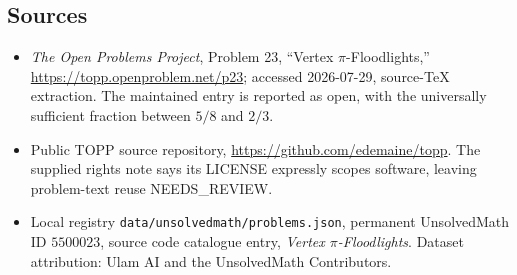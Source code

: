 \documentclass[11pt]{article}
\begin{document}
\subsection{Sources}
\begin{itemize}
\item \emph{The Open Problems Project}, Problem 23, ``Vertex $\pi$-Floodlights,'' \url{https://topp.openproblem.net/p23}; accessed 2026-07-29, source-TeX extraction. The maintained entry is reported as open, with the universally sufficient fraction between $5/8$ and $2/3$.
\item Public TOPP source repository, \url{https://github.com/edemaine/topp}. The supplied rights note says its LICENSE expressly scopes software, leaving problem-text reuse NEEDS\_REVIEW.
\item Local registry \texttt{data/unsolvedmath/problems.json}, permanent UnsolvedMath ID $5500023$, source code catalogue entry, \emph{Vertex $\pi$-Floodlights}. Dataset attribution: Ulam AI and the UnsolvedMath Contributors.
\end{itemize}
\end{document}
